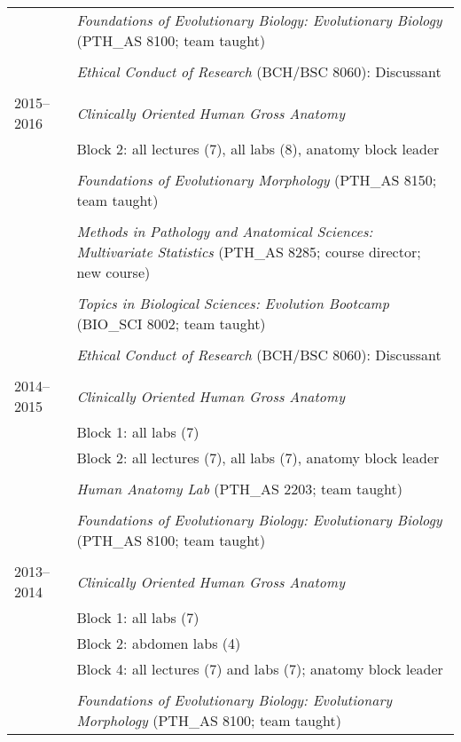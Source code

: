 \begin{longtable}{@{}lX@{}}
    \\
    & \textit{Foundations of Evolutionary Biology: Evolutionary Biology} (PTH\_AS 8100; team taught)\\
    \\
    & \textit{Ethical Conduct of Research} (BCH/BSC 8060): Discussant\\
    \\
    2015--2016 & \textit{Clinically Oriented Human Gross Anatomy}\\
    & Block 2: all lectures (7), all labs (8), anatomy block leader\\
    \\
    & \textit{Foundations of Evolutionary Morphology} (PTH\_AS 8150; team taught)\\
    \\
    & \textit{Methods in Pathology and Anatomical Sciences: Multivariate Statistics} (PTH\_AS 8285; course director; new course)\\
    \\
    & \textit{Topics in Biological Sciences: Evolution Bootcamp} (BIO\_SCI 8002; team taught)\\
    \\
    & \textit{Ethical Conduct of Research} (BCH/BSC 8060): Discussant\\
    \\
    2014--2015& \textit{Clinically Oriented Human Gross Anatomy}\\
    & Block 1: all labs (7)\\
    & Block 2: all lectures (7), all labs (7), anatomy block leader\\
    \\
    & \textit{Human Anatomy Lab} (PTH\_AS 2203; team taught)\\
    \\
    & \textit{Foundations of Evolutionary Biology: Evolutionary Biology} (PTH\_AS 8100; team taught)\\
    \\
    2013--2014 & \textit{Clinically Oriented Human Gross Anatomy}\\
    & Block 1: all labs (7)\\
    & Block 2: abdomen labs (4)\\
    & Block 4: all lectures (7) and labs (7); anatomy block leader\\
    \\
    & \textit{Foundations of Evolutionary Biology: Evolutionary Morphology} (PTH\_AS 8100; team taught)\\

\end{longtable}
